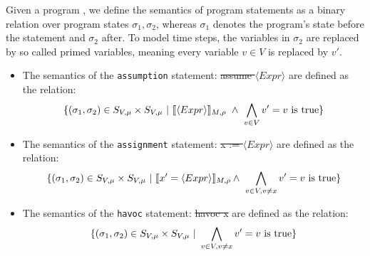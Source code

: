 \begin{mydef}
		Given a program \prg, we define the semantics of program statements as a binary relation over program states $\sigma_1, \sigma_2$, whereas $\sigma_1$ denotes the program's state before the statement and $\sigma_2$ after. To model time steps, the variables in $\sigma_2$ are replaced by so called primed variables, meaning every variable $v \in V$ is replaced by $v'$. \\
	\begin{itemize}
		\item The semantics of the \textnormal{\texttt{assumption}} statement: \textnormal{\st{assume $\langle Expr \rangle$}} are defined as the relation: \\
		\begin{equation*}
			\{(\sigma_1, \sigma_2) \in \stateSpace \times \stateSpace\ |\ \eval{\langle Expr \rangle}\ \land\ \bigwedge\limits_{v \in V} v' = v  \text{ is true}\}
		\end{equation*}
		\item The semantics of the \textnormal{\texttt{assignment}} statement: \textnormal{\st{x := $\langle Expr \rangle$}} are defined as the relation: \\
		\begin{equation*}
			 \{(\sigma_1, \sigma_2) \in \stateSpace \times \stateSpace\ |\ \eval{x' = \langle Expr\rangle } \land\ \bigwedge\limits_{v \in V, v \not= x} v' = v 
			\text{ is true}\}
		\end{equation*}
		\item The semantics of the \textnormal{\texttt{havoc}} statement: \textnormal{\st{havoc x}} are defined as the relation: \\
		\begin{equation*}
			\{(\sigma_1, \sigma_2) \in S_{V, \mu} \times S_{V, \mu}\ |\ \bigwedge\limits_{v 	\in V, v \not= x} v' = v 
			\text{ is true} \}
		\end{equation*}
	\end{itemize}
\end{mydef}



